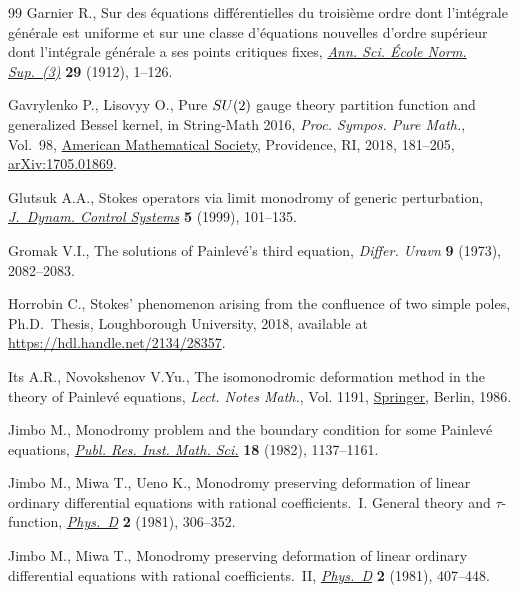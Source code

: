 \documentclass[11pt]{article}
\numberwithin{equation}{section}
\numberwithin{equation}{section}
\begin{document}
\begin{thebibliography}{99}
Garnier R., Sur des \'equations diff\'erentielles du troisi\`eme ordre dont
 l'int\'egrale g\'en\'erale est uniforme et sur une classe d'\'equations
 nouvelles d'ordre sup\'erieur dont l'int\'egrale g\'en\'erale a ses points
 critiques fixes, \href{https://doi.org/10.24033/asens.644}{\textit{Ann. Sci. \'{E}cole Norm. Sup.~(3)}} \textbf{29}
 (1912), 1--126.

Gavrylenko P., Lisovyy O., Pure {${\rm SU}(2)$} gauge theory partition function
 and generalized {B}essel kernel, in String-{M}ath 2016, \textit{Proc. Sympos.
 Pure Math.}, Vol.~98, \href{https://doi.org/10.1090/pspum/098/07}{American Mathematical Society}, Providence, RI, 2018,
 181--205, \href{https://arxiv.org/abs/1705.01869}{arXiv:1705.01869}.

Glutsuk A.A., Stokes operators via limit monodromy of generic perturbation,
 \href{https://doi.org/10.1023/A:1021744801409}{\textit{J.~Dynam. Control Systems}} \textbf{5} (1999), 101--135.

Gromak V.I., The solutions of {P}ainlev\'e's third equation, \textit{Differ.
 Uravn} \textbf{9} (1973), 2082--2083.

Horrobin C., Stokes' phenomenon arising from the confluence of two simple
 poles, Ph.D.~Thesis, {L}oughborough {U}niversity, 2018, available at
 \url{https://hdl.handle.net/2134/28357}.

Its A.R., Novokshenov V.Yu., The isomonodromic deformation method in the theory
 of {P}ainlev\'e equations, \textit{Lect. Notes Math.}, Vol. 1191, \href{https://doi.org/10.1007/BFb0076661}{Springer},
 Berlin, 1986.

Jimbo M., Monodromy problem and the boundary condition for some {P}ainlev\'e
 equations, \href{https://doi.org/10.2977/prims/1195183300}{\textit{Publ. Res. Inst. Math. Sci.}} \textbf{18} (1982),
 1137--1161.

Jimbo M., Miwa T., Ueno K., Monodromy preserving deformation of linear ordinary
 differential equations with rational coefficients.~{I}. {G}eneral theory and
 {$\tau $}-function, \href{https://doi.org/10.1016/0167-2789(81)90013-0}{\textit{Phys.~D}} \textbf{2} (1981), 306--352.

Jimbo M., Miwa T., Monodromy preserving deformation of linear ordinary
 differential equations with rational coefficients.~{II}, \href{https://doi.org/10.1016/0167-2789(81)90021-X}{\textit{Phys.~D}}
 \textbf{2} (1981), 407--448.


\end{thebibliography}
\end{document}
